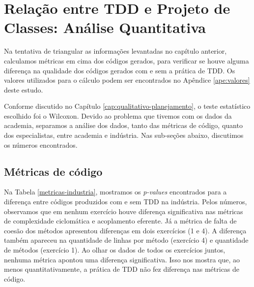 \chapter{Relação entre TDD e Projeto de Classes: Análise Quantitativa}
\label{cap:analise-quantitativa}

Na tentativa de triangular as informações levantadas no capítulo anterior,
calculamos métricas em cima dos códigos gerados, para verificar se houve
alguma diferença na qualidade dos códigos gerados com e sem a prática de TDD.
Os valores utilizados para o cálculo podem ser encontrados no Apêndice 
\ref{ape:valores} deste estudo.


Conforme discutido no Capítulo \ref{cap:qualitativo-planejamento}, o teste
estatístico escolhido foi o Wilcoxon. 
Devido ao problema que tivemos com os dados da academia, separamos a análise
dos dados, tanto das métricas de código, quanto dos especialistas, entre academia e indústria.
Nas sub-seções abaixo, discutimos os números encontrados.

\section{Métricas de código}

Na Tabela \ref{metricas-industria}, mostramos os \textit{p-values} encontrados para
a diferença entre códigos produzidos com e sem TDD na indústria. 
Pelos números, 
observamos que em nenhum exercício houve diferença significativa nas métricas
de complexidade ciclomática e acoplamento eferente. Já a métrica de falta
de coesão dos métodos apresentou diferenças em dois exercícios (1 e 4). 
A diferença também apareceu na quantidade de linhas por método (exercício 4)
e quantidade de métodos (exercício 1). Ao olhar os dados de todos os exercícios
juntos, nenhuma métrica apontou uma diferença significativa.
Isso nos mostra que, ao menos quantitativamente, a prática de TDD não fez
diferença nas métricas de código.

